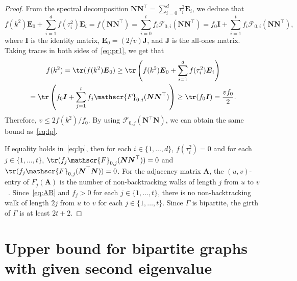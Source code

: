 \begin{proof}
From the spectral decomposition $\boldsymbol{N}\boldsymbol{N}^{\top}= 
\sum_{i=0}^d \tau_i^2 \boldsymbol{E}_i$, we deduce that 
\begin{equation} \label{eq:pr1}
f(k^2) \boldsymbol{E}_0+ \sum_{i=1}^d f(\tau_i^2) \boldsymbol{E}_i
=f(\boldsymbol{N}\boldsymbol{N}^{\top})=\sum_{i= 0}^t f_i \mathscr{F}_{0,i}(\boldsymbol{N}\boldsymbol{N}^{\top})=
f_0 \boldsymbol{I} + \sum_{i= 1}^t f_i \mathscr{F}_{0,i}(\boldsymbol{N}\boldsymbol{N}^{\top}), 
\end{equation}
where $\boldsymbol{I}$ is the identity matrix, $\boldsymbol{E}_0=(2/v)\boldsymbol{J}$, and $\boldsymbol{J}$ is the all-ones matrix. 
Taking traces in both sides of~\eqref{eq:pr1}, we get that
\begin{multline*}
 f(k^2)=\tr ( f(k^2) \boldsymbol{E}_0 )
\geq \tr \left( f(k^2) \boldsymbol{E}_0+ \sum_{i=1}^d f(\tau_i^2) \boldsymbol{E}_i\right) \\
= 
\tr \left( f_0 \boldsymbol{I} + \sum_{j= 1}^t f_j\mathscr{F}_{0,j}(\boldsymbol{N}\boldsymbol{N}^{\top}) \right) 
\geq \tr ( f_0 \boldsymbol{I})
=\frac{v f_0}{2}. 
\end{multline*}
Therefore, $v\leq 2 f(k^2)/f_0$. 
By using $\mathscr{F}_{0,j}(\boldsymbol{N}^{\top} \boldsymbol{N})$, 
we can obtain the same bound as~\eqref{eq:lp}. 

If equality holds in~\eqref{eq:lp}, then for each $i \in \{1,\ldots, d\}$, $f(\tau_i^2)=0$ and for each $j\in \{1,\dots,t\}$, $\tr (f_j\mathscr{F}_{0,j}(\boldsymbol{N}\boldsymbol{N}^{\top}))=0$ and $\tr (f_j\mathscr{F}_{0,j}(\boldsymbol{N}^{\top} \boldsymbol{N}))=0$. 
 For the adjacency matrix $\boldsymbol{A}$, the $(u,v)$-entry of $F_{j}(\boldsymbol{A})$ is the number of non-backtracking walks of length $j$ from $u$ to $v$~\cite{S66}. 
Since~\eqref{eq:AB} and $f_j>0$ for each $j \in \{1,\ldots, t\}$, there is no non-backtracking walk of length $2j$ from $u$ to $v$ for each $j \in \{1,\ldots, t\}$. Since $\Gamma$ is bipartite, the girth of $\Gamma$ is at least $2t+2$. 
\end{proof}


\section{Upper bound for bipartite graphs with given second eigenvalue}
\label{sec:newbound}


